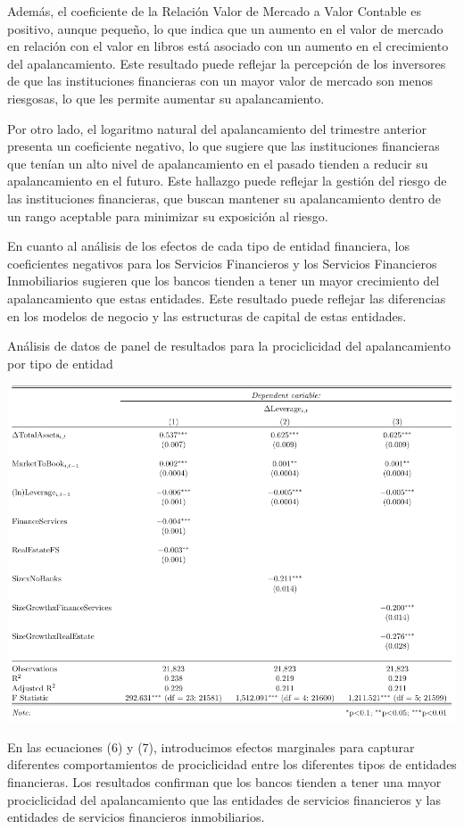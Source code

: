 \documentclass[a4paper,fleqn]{cas-sc}
\begin{document}
Además, el coeficiente de la Relación Valor de Mercado a Valor Contable es positivo, aunque pequeño, lo que indica que un aumento en el valor de mercado en relación con el valor en libros está asociado con un aumento en el crecimiento del apalancamiento. Este resultado puede reflejar la percepción de los inversores de que las instituciones financieras con un mayor valor de mercado son menos riesgosas, lo que les permite aumentar su apalancamiento.

Por otro lado, el logaritmo natural del apalancamiento del trimestre anterior presenta un coeficiente negativo, lo que sugiere que las instituciones financieras que tenían un alto nivel de apalancamiento en el pasado tienden a reducir su apalancamiento en el futuro. Este hallazgo puede reflejar la gestión del riesgo de las instituciones financieras, que buscan mantener su apalancamiento dentro de un rango aceptable para minimizar su exposición al riesgo.

En cuanto al análisis de los efectos de cada tipo de entidad financiera, los coeficientes negativos para los Servicios Financieros y los Servicios Financieros Inmobiliarios sugieren que los bancos tienden a tener un mayor crecimiento del apalancamiento que estas entidades. Este resultado puede reflejar las diferencias en los modelos de negocio y las estructuras de capital de estas entidades.

\begin{table}[h]
	\centering
	\caption{Análisis de datos de panel de resultados para la prociclicidad del apalancamiento por tipo de entidad}
	\includegraphics[width=.815\textwidth]{tabla6.png}
\end{table}

En las ecuaciones (6) y (7), introducimos efectos marginales para capturar diferentes comportamientos de prociclicidad entre los diferentes tipos de entidades financieras. Los resultados confirman que los bancos tienden a tener una mayor prociclicidad del apalancamiento que las entidades de servicios financieros y las entidades de servicios financieros inmobiliarios.
\end{document}
